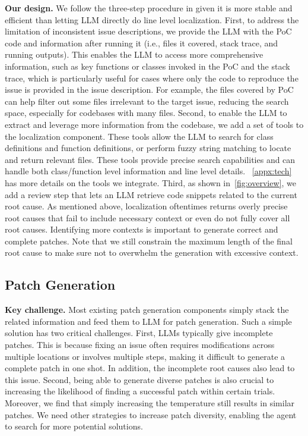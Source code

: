 \textbf{Our design.}
We follow the three-step procedure in \agentless{} given it is more stable and efficient than letting LLM directly do line level localization.
First, to address the limitation of inconsistent issue descriptions, we provide the LLM with the PoC code and information after running it (i.e., files it covered, stack trace, and running outputs). 
This enables the LLM to access more comprehensive information, such as key functions or classes invoked in the PoC and the stack trace, which is particularly useful for cases where only the code to reproduce the issue is provided in the issue description. 
For example, the files covered by PoC can help filter out some files irrelevant to the target issue, reducing the search space, especially for codebases with many files.
Second, to enable the LLM to extract and leverage more information from the codebase, we add a set of tools to the localization component.
These tools allow the LLM to search for class definitions and function definitions, or perform fuzzy string matching to locate and return relevant files. 
These tools provide precise search capabilities and can handle both class/function level information and line level details.
~\cref{appx:tech} has more details on the tools we integrate. 
Third, as shown in~\cref{fig:overview}, we add a review step that lets an LLM retrieve code snippets related to the current root cause.
As mentioned above, localization oftentimes returns overly precise root causes that fail to include necessary context or even do not fully cover all root causes. 
Identifying more contexts is important to generate correct and complete patches.
Note that we still constrain the maximum length of the final root cause to make sure not to overwhelm the generation with excessive context.


\subsection{Patch Generation}
\label{subsec:generation}

\textbf{Key challenge.}
Most existing patch generation components simply stack the related information and feed them to LLM for patch generation.
Such a simple solution has two critical challenges.
First, LLMs typically give incomplete patches.
This is because fixing an issue often requires modifications across multiple locations or involves multiple steps, making it difficult to generate a complete patch in one shot.
In addition, the incomplete root causes also lead to this issue. 
Second, being able to generate diverse patches is also crucial to increasing the likelihood of finding a successful patch within certain trials.
Moreover, we find that simply increasing the temperature still results in similar patches.
We need other strategies to increase patch diversity, enabling the agent to search for more potential solutions.


